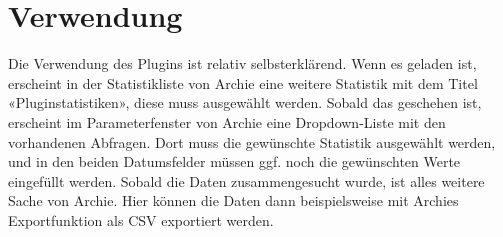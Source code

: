 \documentclass[a4paper]{scrartcl}
\begin{document}
\section{Verwendung}
Die Verwendung des Plugins ist relativ selbsterklärend. Wenn es geladen ist,
erscheint in der Statistikliste von Archie eine weitere Statistik mit dem Titel
«Pluginstatistiken», diese muss ausgewählt werden. Sobald das geschehen ist,
erscheint im Parameterfenster von Archie eine Dropdown-Liste mit den vorhandenen
Abfragen. Dort muss die ge\-wünsch\-te Statistik ausgewählt werden, und in den
beiden Datumsfelder müssen ggf. noch die gewünschten Werte eingefüllt werden.
Sobald die Daten zusammengesucht wurde, ist alles weitere Sache von Archie. Hier
können die Daten dann beispielsweise mit Archies Exportfunktion als CSV
exportiert werden.
\end{document}
